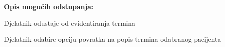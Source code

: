 \begin{packed_item}
					\item  \textbf{Opis mogućih odstupanja:}
					
					\item[] \begin{packed_item}
						
						\item[3.a] Djelatnik odustaje od evidentiranja termina
						\item[] \begin{packed_enum}
							\item Djelatnik odabire opciju povratka na popis termina odabranog pacijenta
							
						\end{packed_enum}
					\end{packed_item}
				\end{packed_item}
				
